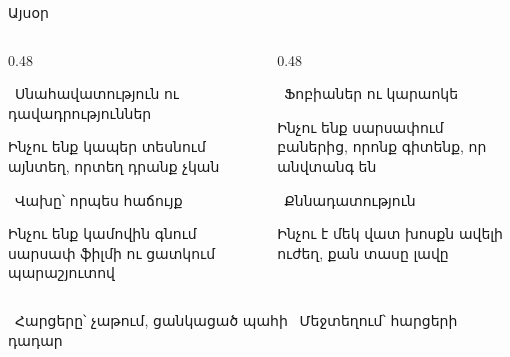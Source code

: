 \begin{frame}{Այսօր}
  \begin{columns}[T]
    \begin{column}{0.48\textwidth}
      \begin{card}[colback=lavender!40!cream]
        \ {\blackfont Սնահավատություն ու դավադրություններ}\par\smallskip
        Ինչու ենք կապեր տեսնում այնտեղ, որտեղ դրանք չկան
      \end{card}
      \begin{card}[colback=peach!45!cream]
        \ {\blackfont Վախը՝ որպես հաճույք}\par\smallskip
        Ինչու ենք կամովին գնում սարսափ ֆիլմի ու ցատկում պարաշյուտով
      \end{card}
    \end{column}
    \begin{column}{0.48\textwidth}
      \begin{card}[colback=mint!40!cream]
        \ {\blackfont Ֆոբիաներ ու կարաոկե}\par\smallskip
        Ինչու ենք սարսափում բաներից, որոնք գիտենք, որ անվտանգ են
      \end{card}
      \begin{card}[colback=brainpink!35!cream]
        \ {\blackfont Քննադատություն}\par\smallskip
        Ինչու է մեկ վատ խոսքն ավելի ուժեղ, քան տասը լավը
      \end{card}
    \end{column}
  \end{columns}
  \vspace{2mm}
  \centering
  {\small {}\ Հարցերը՝ չաթում, ցանկացած պահի \qquad {}\ Մեջտեղում՝ հարցերի դադար} %
\end{frame}
